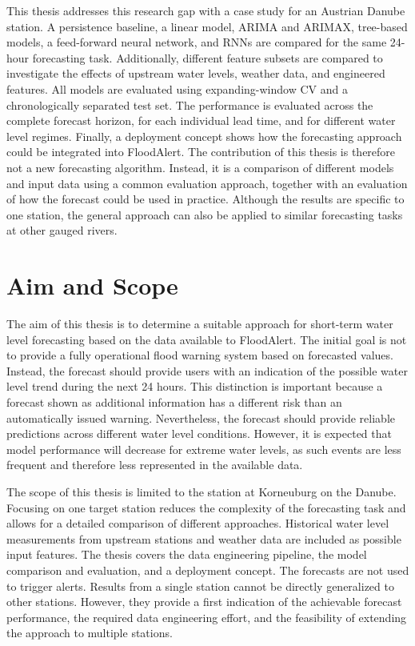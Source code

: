 This thesis addresses this research gap with a case study for an Austrian Danube station. A persistence baseline, a linear model, \ac{ARIMA} and \ac{ARIMAX}, tree-based models, a feed-forward neural network, and \acp{RNN} are compared for the same 24-hour forecasting task. Additionally, different feature subsets are compared to investigate the effects of upstream water levels, weather data, and engineered features. All models are evaluated using expanding-window \ac{CV} and a chronologically separated test set. The performance is evaluated across the complete forecast horizon, for each individual lead time, and for different water level regimes. Finally, a deployment concept shows how the forecasting approach could be integrated into FloodAlert. The contribution of this thesis is therefore not a new forecasting algorithm. Instead, it is a comparison of different models and input data using a common evaluation approach, together with an evaluation of how the forecast could be used in practice. Although the results are specific to one station, the general approach can also be applied to similar forecasting tasks at other gauged rivers.


\section{Aim and Scope}
The aim of this thesis is to determine a suitable approach for short-term water level forecasting based on the data available to FloodAlert. The initial goal is not to provide a fully operational flood warning system based on forecasted values. Instead, the forecast should provide users with an indication of the possible water level trend during the next 24 hours. This distinction is important because a forecast shown as additional information has a different risk than an automatically issued warning. Nevertheless, the forecast should provide reliable predictions across different water level conditions. However, it is expected that model performance will decrease for extreme water levels, as such events are less frequent and therefore less represented in the available data.

The scope of this thesis is limited to the station at Korneuburg on the Danube. Focusing on one target station reduces the complexity of the forecasting task and allows for a detailed comparison of different approaches. Historical water level measurements from upstream stations and weather data are included as possible input features. The thesis covers the data engineering pipeline, the model comparison and evaluation, and a deployment concept. The forecasts are not used to trigger alerts. Results from a single station cannot be directly generalized to other stations. However, they provide a first indication of the achievable forecast performance, the required data engineering effort, and the feasibility of extending the approach to multiple stations.

